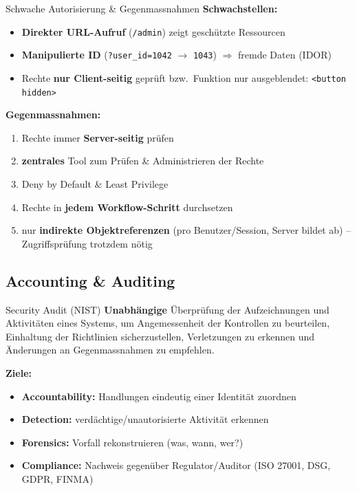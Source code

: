 \documentclass[a4paper, fontsize=7pt]{scrartcl}
\begin{document}
\begin{mainbox}{Schwache Autorisierung \& Gegenmassnahmen}
\textbf{Schwachstellen:}
\begin{itemize}
    \item \textbf{Direkter URL-Aufruf} (\texttt{/admin}) zeigt geschützte
          Ressourcen
    \item \textbf{Manipulierte ID} (\texttt{?user\_id=1042} $\to$
          \texttt{1043}) $\Rightarrow$ fremde Daten (IDOR)
    \item Rechte \textbf{nur Client-seitig} geprüft bzw.\ Funktion nur
          ausgeblendet: \texttt{<button hidden>}
\end{itemize}
\textbf{Gegenmassnahmen:}
\begin{enumerate}
    \item Rechte immer \textbf{Server-seitig} prüfen
    \item \textbf{zentrales} Tool zum Prüfen \& Administrieren der Rechte
    \item Deny by Default \& Least Privilege
    \item Rechte in \textbf{jedem Workflow-Schritt} durchsetzen
    \item nur \textbf{indirekte Objektreferenzen} (pro Benutzer/Session,
          Server bildet ab) -- Zugriffsprüfung trotzdem nötig
\end{enumerate}
\end{mainbox}

\subsection{Accounting \& Auditing}

\begin{mainbox}{Security Audit (NIST)}
\textbf{Unabhängige} Überprüfung der Aufzeichnungen und Aktivitäten eines
Systems, um Angemessenheit der Kontrollen zu beurteilen, Einhaltung der
Richtlinien sicherzustellen, Verletzungen zu erkennen und Änderungen an
Gegenmassnahmen zu empfehlen.

\textbf{Ziele:}
\begin{itemize}
    \item \textbf{Accountability:} Handlungen eindeutig einer Identität
          zuordnen
    \item \textbf{Detection:} verdächtige/unautorisierte Aktivität erkennen
    \item \textbf{Forensics:} Vorfall rekonstruieren (was, wann, wer?)
    \item \textbf{Compliance:} Nachweis gegenüber Regulator/Auditor
          (ISO 27001, DSG, GDPR, FINMA)
\end{itemize}
\end{mainbox}
\end{document}

